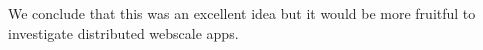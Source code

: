 We conclude that this was an excellent idea but it would be more fruitful to
investigate distributed webscale apps.